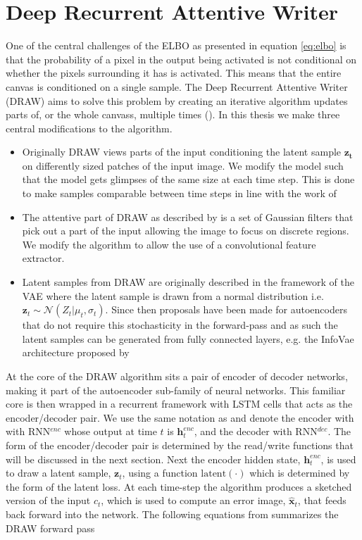 \section{Deep Recurrent Attentive Writer}\label{sec:draw}

One of the central challenges of the ELBO as presented in equation \ref{eq:elbo} is that the probability of a pixel in the output being activated is not conditional on whether the pixels surrounding it has is activated. This means that the entire canvas is conditioned on a single sample. The Deep Recurrent Attentive Writer (DRAW) aims to solve this problem by creating an iterative algorithm updates parts of, or the whole canvass, multiple times (\cite{Gregor2015}). In this thesis we make three central modifications to the algorithm. 

\begin{itemize}
\item Originally DRAW views parts of the input conditioning the latent sample $\mathbf{z_t}$ on differently sized patches of the input image. We modify the model such that the model gets glimpses of the same size at each time step. This is done to make samples comparable between time steps in line with the work of \citet{Harris2019}
\item The attentive part of DRAW as described by \citet{Gregor2015} is a set of Gaussian filters that pick out a part of the input allowing the image to focus on discrete regions. We modify the algorithm to allow the use of a convolutional feature extractor.
\item Latent samples from DRAW are originally described in the framework of the VAE where the latent sample is drawn from a normal distribution i.e. $\mathbf{z}_t \sim \mathcal{N}(Z_t|\mu_t, \sigma_t)$. Since then proposals have been made for autoencoders that do not require this stochasticity in the forward-pass and as such the latent samples can be generated from fully connected layers, e.g. the InfoVae architecture proposed by \citet{Zhao}
\end{itemize}

\noindent At the core of the DRAW algorithm sits a pair of encoder of decoder networks, making it part of the autoencoder sub-family of neural networks. This familiar core is then wrapped in a recurrent framework with LSTM cells that acts as the encoder/decoder pair. We use the same notation as \citet{Gregor2015} and denote the encoder with with RNN${}^{enc}$ whose output at time $t$ is $\mathbf{h}_t^{enc}$, and the decoder with RNN${}^{dec}$. The form of the encoder/decoder pair is determined by the read/write functions that will be discussed in the next section. Next the encoder hidden state, $\mathbf{h}_t^{enc}$, is used to draw a latent sample, $\mathbf{z}_t$, using a function $\text{latent}(\cdot)$ which is determined by the form of the latent loss. At each time-step the algorithm produces a sketched version of the input $c_t$, which is used to compute an error image, $\hat{\mathbf{x}}_t$, that feeds back forward into the network. The following equations from \citet{Gregor2015} summarizes the DRAW forward pass

